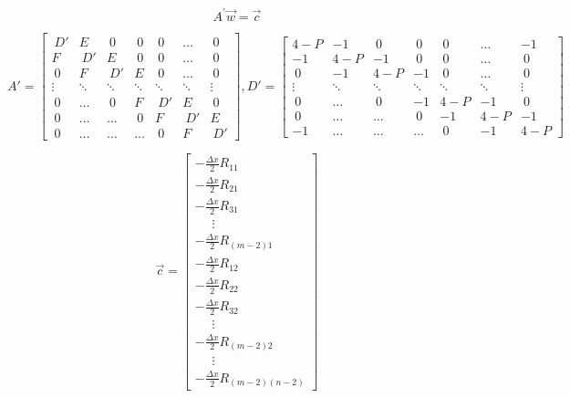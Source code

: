 \documentclass[a4paper,fleqn,10pt]{report}
\begin{document}
\begin{CJK*}{UTF8}{bsmi}
\begin{equation*}
A^{'}\vec{w} = \vec{c}
\end{equation*}

\begin{equation*}
A' =
\begin{bmatrix}
        ~D' & E & ~0 & ~0 & ~0 & \ldots & ~0 \\
        F & ~D' & E & ~0 & ~0 & \ldots & ~0 \\
        ~0 & F & ~D' & E & ~0 & \ldots & ~0 \\
        \vdots & \ddots & \ddots & \ddots & \ddots & \ddots & \vdots \\
        ~0 & \ldots & ~0 & F & ~D' & E & ~0 \\
        ~0 & \ldots & \ldots & ~0 & F & ~D' & E \\
        ~0 & \ldots & \ldots & \ldots & ~0 & F & ~D'
\end{bmatrix}, 
D' = 
\begin{bmatrix}
	4-P & -1 & ~0 & ~0 & ~0 & \ldots & -1 \\
        -1 & 4-P & -1 & ~0 & ~0 & \ldots & ~0 \\
        ~0 & -1 & 4-P & -1 & ~0 & \ldots & ~0 \\
        \vdots & \ddots & \ddots & \ddots & \ddots & \ddots & \vdots \\
        ~0 & \ldots & ~0 & -1 & 4-P & -1 & ~0 \\
        ~0 & \ldots & \ldots & ~0 & -1 & 4-P & -1 \\
        -1 & \ldots & \ldots & \ldots & ~0 & -1 & 4-P

\end{bmatrix}
\end{equation*}


\begin{equation*}
\vec{c} =
\begin{bmatrix}
        -\frac{\Delta x}{2}R_{11} \\
        -\frac{\Delta x}{2}R_{21} \\
        -\frac{\Delta x}{2}R_{31} \\
		~~~~~~\vdots \\
		-\frac{\Delta x}{2}R_{(m-2)1}  \\
        -\frac{\Delta x}{2}R_{12} \\
        -\frac{\Delta x}{2}R_{22} \\
        -\frac{\Delta x}{2}R_{32} \\
        ~~~~~~\vdots \\
        -\frac{\Delta x}{2}R_{(m-2)2} \\
        ~~~~~~\vdots \\
        -\frac{\Delta x}{2}R_{(m-2)(n-2)}  
\end{bmatrix}
\end{equation*}


\end{CJK*}
\end{document}
